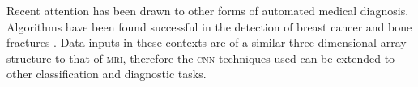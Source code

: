 Recent attention has been drawn to other forms of automated medical diagnosis. Algorithms have been found successful in the detection of breast cancer \citep{LiuYun2018} and bone fractures \citep{Lindsey2018}. Data inputs in these contexts are of a similar three-dimensional array structure to that of \textsc{mri}, therefore the \textsc{cnn} techniques used can be extended to other classification and diagnostic tasks.
 

%
%